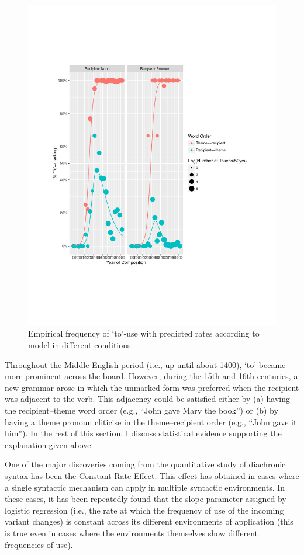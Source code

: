 	\begin{figure}[p!]
		\includegraphics[width=.95\linewidth]{../images/to-marking-graph}
		\caption{Empirical frequency of `to'-use with predicted rates according to model in different conditions}
		\label{fig:to-use}
	\end{figure}

	Throughout the Middle English period (i.e., up until about 1400), `to' became more prominent across the board. However, during the 15th and 16th centuries, a new grammar arose in which the unmarked form was preferred when the recipient was adjacent to the verb. This adjacency could be satisfied either by (a) having the recipient--theme word order (e.g., ``John gave Mary the book'') or (b) by having a theme pronoun cliticise in the theme--recipient order (e.g., ``John gave it him''). In the rest of this section, I discuss statistical evidence supporting the explanation given above.

	One of the major discoveries coming from the quantitative study of diachronic syntax has been the Constant Rate Effect. This effect has obtained in cases where a single syntactic mechanism can apply in multiple syntactic environments. In these cases, it has been repeatedly found that the slope parameter assigned by logistic regression (i.e., the rate at which the frequency of use of the incoming variant changes) is constant across its different environments of application (this is true even in cases where the environments themselves show different frequencies of use). 

